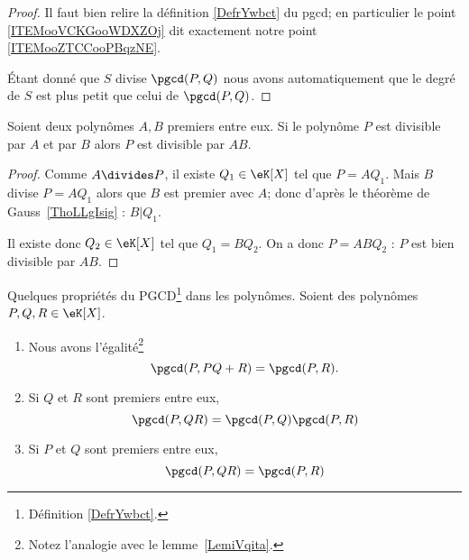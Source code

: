 \begin{proof}
	Il faut bien relire la définition \ref{DefrYwbct} du pgcd; en particulier le point \ref{ITEMooVCKGooWDXZOj} dit exactement notre point \ref{ITEMooZTCCooPBqzNE}.

	Étant donné que \( S\) divise \( \pgcd(P,Q)\) nous avons automatiquement que le degré de \( S\) est plus petit que celui de \( \pgcd(P,Q)\).
\end{proof}

\begin{lemma}       \label{LEMooGNAMooXRpgBn}
	Soient deux polynômes \( A,B\) premiers entre eux. Si le polynôme \( P\) est divisible par \( A\) et par \( B\) alors \( P\) est divisible par \( AB\).
\end{lemma}

\begin{proof}
	Comme \( A\divides P\), il existe \( Q_1\in \eK[X]\) tel que \( P=AQ_1\). Mais \( B\) divise \( P=AQ_1\) alors que \( B\) est premier avec \( A\); donc d'après le théorème de Gauss~\ref{ThoLLgIsig} : \( B|Q_1\).

	Il existe donc \( Q_2\in \eK[X]\) tel que \( Q_1=BQ_2\). On a donc \( P=ABQ_2\) : \( P\) est bien divisible par \( AB\).
\end{proof}

\begin{lemma}   \label{LemUELTuwK}
	Quelques propriétés du PGCD\footnote{Définition \ref{DefrYwbct}.} dans les polynômes. Soient des polynômes \( P,Q,R\in \eK[X]\).
	\begin{enumerate}
		\item       \label{ITEMooBPOZooYeFGjl}
		      Nous avons l'égalité\footnote{Notez l'analogie avec le lemme~\ref{LemiVqita}.}
		      \begin{equation}
			      \pgcd(P,PQ+R)=\pgcd(P,R).
		      \end{equation}
		\item       \label{ITEMooUVGRooNSGDZn}
		      Si \( Q \) et \( R\) sont premiers entre eux,
		      \begin{equation}
			      \pgcd(P,QR)=\pgcd(P,Q)\pgcd(P,R)
		      \end{equation}
		\item       \label{ITEMooYXAHooXibkgV}
		      Si \( P\) et \( Q\) sont premiers entre eux,
		      \begin{equation}
			      \pgcd(P,QR)=\pgcd(P,R)
		      \end{equation}
	\end{enumerate}
\end{lemma}

